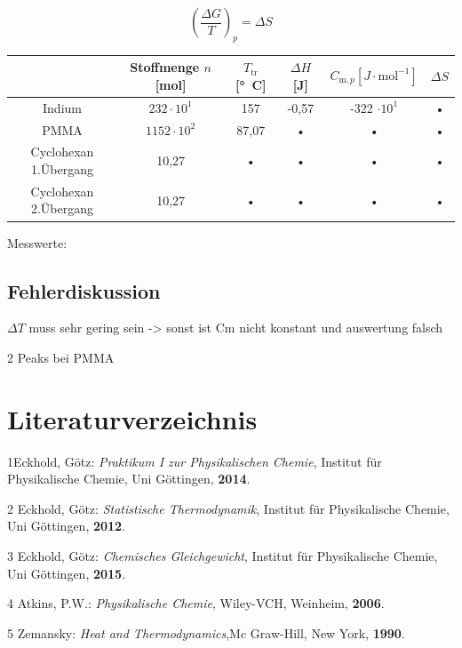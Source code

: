 \documentclass[a4paper,12pt,oneside,onecolum,final,openany]{report}
\begin{document}
\begin{equation}\label{S}
\left(\frac{\Delta G}{T}\right)_p = \Delta S
\end{equation}
\begin{tabular}{|c|c|c|c|c|c|}
\hline 
 & Stoffmenge $n$ [mol] & $T_\mathrm{tr}$ [°~C] & $\Delta H$ [J] & $C_{\mathrm{m},p} [J \cdot \mathrm{mol}^{-1}]$ & $\Delta S$ \\ 
\hline 
Indium & $232 \cdot 10^1$ & 157 & -0,57 & -322 $\cdot 10^1$ & • \\ 
\hline 
PMMA & $1152 \cdot 10^2$ & 87,07 & • & • & • \\ 
\hline 
Cyclohexan 1.Übergang & 10,27 & • & • & • & • \\ 
Cyclohexan 2.Übergang & 10,27 & • & • & • & • \\
\hline 
\end{tabular} 



Messwerte:\\










\section{Fehlerdiskussion}
$\Delta T$ muss sehr gering sein -> sonst ist Cm nicht konstant und auswertung falsch

2 Peaks bei PMMA

\chapter{Literaturverzeichnis}
1\quad Eckhold, Götz: \emph{Praktikum I zur Physikalischen Chemie}, Institut für Physikalische Chemie, Uni Göttingen, \textbf{2014}.

\vspace{0,5 cm}

2 \quad Eckhold, Götz: \emph{Statistische Thermodynamik}, Institut für Physikalische Chemie, Uni Göttingen, \textbf{2012}.

\vspace{0,5cm}

3 \quad Eckhold, Götz: \emph{Chemisches Gleichgewicht}, Institut für Physikalische Chemie, Uni Göttingen, \textbf{2015}.\\

\vspace{0,5cm}

4 \quad Atkins, P.W.: \emph{Physikalische Chemie}, Wiley-VCH, Weinheim, \textbf{2006}.\\

\vspace{0,5cm}

5 \quad Zemansky: \emph{Heat and Thermodynamics},Mc Graw-Hill, New York, \textbf{1990}.\\
\end{document}
